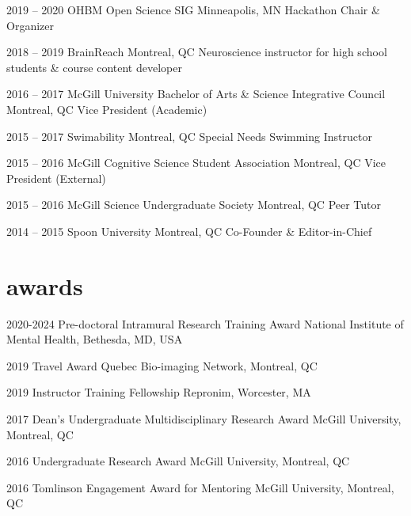 \documentclass[]{friggeri-cv} %
\begin{document}
\begin{entrylist}
\entry
{2019 -- 2020}
{OHBM Open Science SIG}
{Minneapolis, MN}
{Hackathon Chair \& Organizer}

\entry
{2018 -- 2019}
{BrainReach}
{Montreal, QC}
{Neuroscience instructor for high school students \& course content developer}

\entry
{2016 -- 2017}
{McGill University Bachelor of Arts \& Science Integrative Council}
{Montreal, QC}
{Vice President (Academic)}

\end{entrylist}



\begin{entrylist}

\entry
{2015 -- 2017}
{Swimability}
{Montreal, QC}
{Special Needs Swimming Instructor}

\entry
{2015 -- 2016}
{McGill Cognitive Science Student Association}
{Montreal, QC}
{Vice President (External)}
 
\entry
{2015 -- 2016}
{McGill Science Undergraduate Society}
{Montreal, QC}
{Peer Tutor}

\entry
{2014 -- 2015}
{Spoon University}
{Montreal, QC}
{Co-Founder \& Editor-in-Chief}
\end{entrylist}


\section{awards}

\begin{entrylist}
\vspace{-7pt}

\entry
{2020-2024}
{Pre-doctoral Intramural Research Training Award}
{National Institute of Mental Health, Bethesda, MD, USA}
{}
\vspace{-7pt}

\entry
{2019}
{Travel Award}
{Quebec Bio-imaging Network, Montreal, QC}
{}
\vspace{-7pt}

\entry
{2019}
{Instructor Training Fellowship}
{Repronim, Worcester, MA}
{}
\vspace{-7pt}

\entry
{2017}
{Dean's Undergraduate Multidisciplinary Research Award}
{McGill University, Montreal, QC}
{}
\vspace{-7pt}

\entry
{2016}
{Undergraduate Research Award}
{McGill University, Montreal, QC}
{}
\vspace{-7pt}

\entry
{2016}
{Tomlinson Engagement Award for Mentoring}
{McGill University, Montreal, QC}
{}
\vspace{-7pt}

\end{entrylist}
\end{document}
